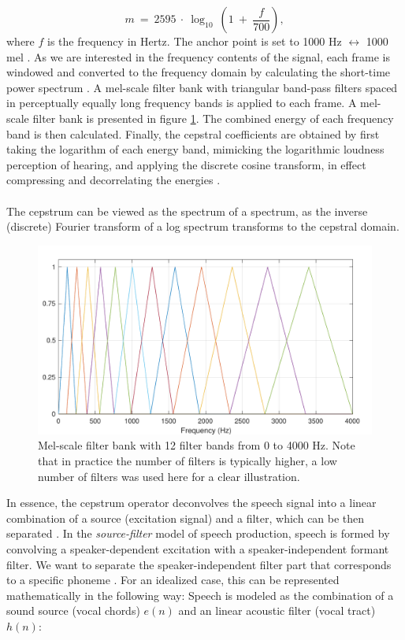 \documentclass[english, 12pt, a4paper, pdftex, elec, utf8]{aaltothesis}
\begin{document}
\begin{equation} \label{eq:mel}
m \ = \ 2595 \  \cdot \ \log_{10} \ \left(1 \ + \ \frac{f}{700} \right),
\end{equation} where $f$ is the frequency in Hertz. The anchor point is set to 1000 Hz $\leftrightarrow$ 1000 mel \cite[p.~174--175]{pulkki2015communication}. As we are interested in the frequency contents of the signal, each frame is windowed and converted to the frequency domain by calculating the short-time power spectrum \cite{gales2008application}. A mel-scale filter bank with triangular band-pass filters spaced in perceptually equally long frequency bands is applied to each frame. A mel-scale filter bank is presented in figure \ref{fig:melbank}. The combined energy of each frequency band is then calculated. Finally, the cepstral coefficients are obtained by first taking the logarithm of each energy band, mimicking the logarithmic loudness perception of hearing, and applying the discrete cosine transform, in effect compressing and decorrelating the energies \cite{huang2001spoken, gales2008application}. \\\\
The cepstrum can be viewed as the spectrum of a spectrum, as the inverse (discrete) Fourier transform of a log spectrum transforms to the cepstral domain.
\begin{figure}[t]
	\centering
	\includegraphics[trim={0cm 0cm 0cm 0.5cm}, clip, width=\textwidth]{melfilter.pdf}
	\caption{Mel-scale filter bank with 12 filter bands from 0 to 4000 Hz. Note that in practice the number of filters is typically higher, a low number of filters was used here for a clear illustration.}
	\label{fig:melbank} 
\end{figure}
In essence, the cepstrum operator deconvolves the speech signal into a linear combination of a source (excitation signal) and a filter, which can be then separated \cite[p.~306--307]{huang2001spoken}. In the \textit{source-filter} model of speech production, speech is formed by convolving a speaker-dependent excitation with a speaker-independent formant filter. We want to separate the speaker-independent filter part that corresponds to a specific phoneme \cite[p.~288--290]{huang2001spoken}. For an idealized case, this can be represented mathematically in the following way: Speech is modeled as the combination of a sound source (vocal chords) $e(n)$ and an linear acoustic filter (vocal tract) $h(n)$:
\end{document}
